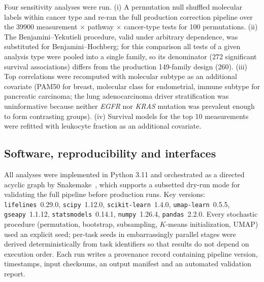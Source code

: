 Four sensitivity analyses were run. (i) A permutation null shuffled molecular
labels within cancer type and re-ran the full production correction pipeline over
the \num{39900} measurement $\times$ pathway $\times$ cancer-type tests for 100
permutations. (ii) The Benjamini--Yekutieli procedure, valid under arbitrary
dependence, was substituted for Benjamini--Hochberg; for this comparison all
tests of a given analysis type were pooled into a single family, so its
denominator (272 significant survival associations) differs from the production
149-family design (260). (iii) Top correlations were recomputed with molecular
subtype as an additional covariate (PAM50 for breast, molecular class for
endometrial, immune subtype for pancreatic carcinoma; the lung adenocarcinoma
driver stratification was uninformative because neither \textit{EGFR} nor
\textit{KRAS} mutation was prevalent enough to form contrasting groups).
(iv) Survival models for the top 10 measurements were refitted with leukocyte
fraction as an additional covariate.

\subsection{Software, reproducibility and interfaces}
\label{sec:methods:software}

All analyses were implemented in Python 3.11 and orchestrated as a directed
acyclic graph by Snakemake~\cite{moeldner2021snakemake}, which supports a
subsetted dry-run mode for validating the full pipeline before production runs.
Key versions: \texttt{lifelines}~0.29.0, \texttt{scipy}~1.12.0,
\texttt{scikit-learn}~1.4.0, \texttt{umap-learn}~0.5.5, \texttt{gseapy}~1.1.12,
\texttt{statsmodels}~0.14.1, \texttt{numpy}~1.26.4, \texttt{pandas}~2.2.0. Every
stochastic procedure (permutation, bootstrap, subsampling, $K$-means
initialization, UMAP) used an explicit seed; per-task seeds in embarrassingly
parallel stages were derived deterministically from task identifiers so that
results do not depend on execution order. Each run writes a provenance record
containing pipeline version, timestamps, input checksums, an output manifest and
an automated validation report.

